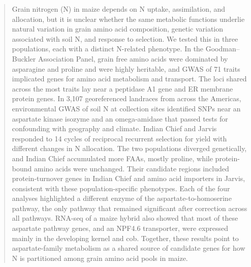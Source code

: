 \begin{abstract}
Grain nitrogen (N) in maize depends on N uptake, assimilation, and allocation, but it is unclear whether the same metabolic functions underlie natural variation in grain amino acid composition, genetic variation associated with soil N, and response to selection. We tested this in three populations, each with a distinct N-related phenotype. In the Goodman--Buckler Association Panel, grain free amino acids were dominated by asparagine and proline and were highly heritable, and GWAS of 71 traits implicated genes for amino acid metabolism and transport. The loci shared across the most traits lay near a peptidase A1 gene and ER membrane protein genes. In 3,107 georeferenced landraces from across the Americas, environmental GWAS of soil N at collection sites identified SNPs near an aspartate kinase isozyme and an omega-amidase that passed tests for confounding with geography and climate. Indian Chief and Jarvis responded to 14 cycles of reciprocal recurrent selection for yield with different changes in N allocation. The two populations diverged genetically, and Indian Chief accumulated more FAAs, mostly proline, while protein-bound amino acids were unchanged. Their candidate regions included protein-turnover genes in Indian Chief and amino acid importers in Jarvis, consistent with these population-specific phenotypes. Each of the four analyses highlighted a different enzyme of the aspartate-to-homoserine pathway, the only pathway that remained significant after correction across all pathways. RNA-seq of a maize hybrid also showed that most of these aspartate pathway genes, and an NPF4.6 transporter, were expressed mainly in the developing kernel and cob. Together, these results point to aspartate-family metabolism as a shared source of candidate genes for how N is partitioned among grain amino acid pools in maize.
\end{abstract}




\maketitle
\thispagestyle{firststyle}
\vspace{-11pt}%

